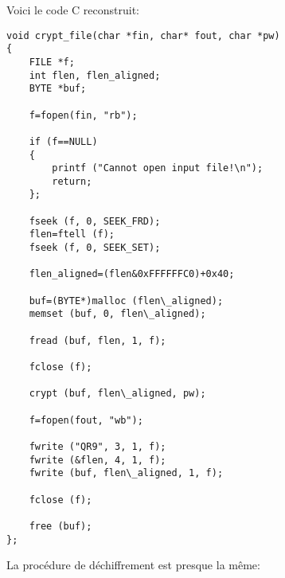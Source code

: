 Voici le code C reconstruit:

\begin{lstlisting}[style=customc]
void crypt_file(char *fin, char* fout, char *pw)
{
	FILE *f;
	int flen, flen_aligned;
	BYTE *buf;

	f=fopen(fin, "rb");
	
	if (f==NULL)
	{
		printf ("Cannot open input file!\n");
		return;
	};

	fseek (f, 0, SEEK_FRD);
	flen=ftell (f);
	fseek (f, 0, SEEK_SET);

	flen_aligned=(flen&0xFFFFFFC0)+0x40;

	buf=(BYTE*)malloc (flen\_aligned);
	memset (buf, 0, flen\_aligned);

	fread (buf, flen, 1, f);

	fclose (f);

	crypt (buf, flen\_aligned, pw);
	
	f=fopen(fout, "wb");

	fwrite ("QR9", 3, 1, f);
	fwrite (&flen, 4, 1, f);
	fwrite (buf, flen\_aligned, 1, f);

	fclose (f);

	free (buf);
};
\end{lstlisting}

La procédure de déchiffrement est presque la même:

